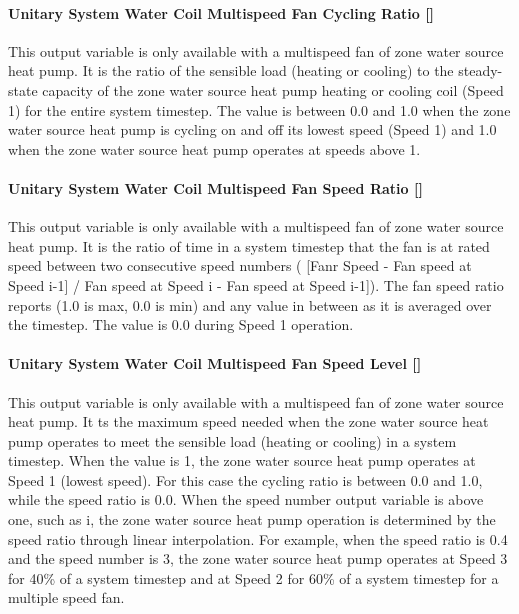 \paragraph{Unitary System Water Coil Multispeed Fan Cycling Ratio {[]}}\label{unitary-system-water-coil-multispeed-fan-cycling-ratio}

This output variable is only available with a multispeed fan of zone water source heat pump. It is the ratio of the sensible load (heating or cooling) to the steady-state capacity of the zone water source heat pump heating or cooling coil (Speed 1) for the entire system timestep. The value is between 0.0 and 1.0 when the zone water source heat pump is cycling on and off its lowest speed (Speed 1) and 1.0 when the zone water source heat pump operates at speeds above 1.

\paragraph{Unitary System Water Coil Multispeed Fan Speed Ratio {[]}}\label{unitary-system-water-coil-multispeed-fan-speed-ratio}

This output variable is only available with a multispeed fan of zone water source heat pump. It is the ratio of time in a system timestep that the fan is at rated speed between two consecutive speed numbers ( [Fanr Speed - Fan speed at Speed i-1] / Fan speed at Speed i - Fan speed at Speed i-1]). The fan speed ratio reports (1.0 is max, 0.0 is min) and any value in between as it is averaged over the timestep. The value is 0.0 during Speed 1 operation.

\paragraph{Unitary System Water Coil Multispeed Fan Speed Level {[]}}\label{unitary-system-water-coil-multispeed-fan-speed-level}

This output variable is only available with a multispeed fan of zone water source heat pump. It ts the maximum speed needed when the zone water source heat pump operates to meet the sensible load (heating or cooling) in a system timestep. When the value is 1, the zone water source heat pump operates at Speed 1 (lowest speed). For this case the cycling ratio is between 0.0 and 1.0, while the speed ratio is 0.0. When the speed number output variable is above one, such as i, the zone water source heat pump operation is determined by the speed ratio through linear interpolation. For example, when the speed ratio is 0.4 and the speed number is 3, the zone water source heat pump operates at Speed 3 for 40\% of a system timestep and at Speed 2 for 60\% of a system timestep for a multiple speed fan.

